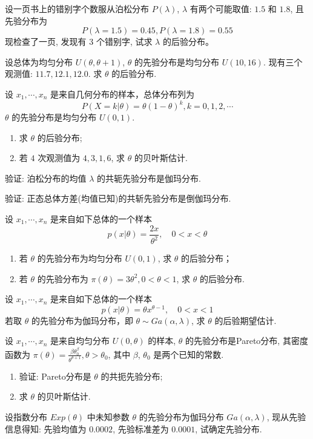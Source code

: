 \begin{xiti}
\item 设一页书上的错别字个数服从泊松分布 $P(\lambda)$, $\lambda$ 有两个可能取值: $1.5$ 和 $1.8$, 且先验分布为
\[P(\lambda=1.5)=0.45, P(\lambda=1.8)=0.55\]
现检查了一页, 发现有 $3$ 个错别字, 试求 $\lambda$ 的后验分布。
\item 设总体为均匀分布 $U(\theta,\theta+1)$, $\theta$ 的先验分布是均匀分布 $U(10,16)$. 现有三个观测值: $11.7,12.1,12.0$. 求 $\theta$ 的后验分布.
    
\item 设 $x_1,\cdots,x_n$ 是来自几何分布的样本，总体分布列为
\[P(X=k | \theta)=\theta(1-\theta)^{k}, k=0,1,2, \cdots\]
$\theta$ 的先验分布是均匀分布 $U(0,1)$.
\begin{enumerate}
  \item 求 $\theta$ 的后验分布;
  \item 若 $4$ 次观测值为 $4,3,1,6$, 求 $\theta$ 的贝叶斯估计.
\end{enumerate}

\item 验证: 泊松分布的均值 $\lambda$ 的共轭先验分布是伽玛分布.

\item 验证: 正态总体方差(均值已知)的共斩先验分布是倒伽玛分布.

\item 设 $x_1,\cdots,x_n$ 是来自如下总体的一个样本
\[p(x|\theta)=\frac{2 x}{\theta^{2}},\quad 0<x<\theta\]
\begin{enumerate}
  \item 若 $\theta$ 的先验分布为均匀分布 $U(0,1)$, 求 $\theta$ 的后验分布；
  \item 若 $\theta$ 的先验分布为 $\pi(\theta)=3 \theta^{2}, 0<\theta<1$, 求 $\theta$ 的后验分布.
\end{enumerate}

\item 设 $x_1,\cdots,x_n$ 是来自如下总体的一个样本
\[p(x | \theta)=\theta x^{\theta-1}, \quad 0<x<1\]
若取 $\theta$ 的先验分布为伽玛分布，即 $\theta \sim Ga (\alpha, \lambda)$, 求 $\theta$ 的后验期望估计.

\item 设 $x_1,\cdots,x_n$ 是来自均匀分布 $U(0,\theta)$ 的样本, $\theta$ 的先验分布是Pareto分布, 其密度函数为 $\pi(\theta)=\frac{\beta \theta_{0}^{\beta}}{\theta^{\theta+1}}, \theta>\theta_{0}$, 其中 $\beta$, $\theta_0$ 是两个已知的常数.
\begin{enumerate}
  \item 验证: Pareto分布是 $\theta$ 的共扼先验分布;
  \item 求 $\theta$ 的贝叶斯估计.
\end{enumerate}

\item 设指数分布 $Exp(\theta)$ 中未知参数 $\theta$ 的先验分布为伽玛分布 $Ga (\alpha, \lambda)$, 现从先验信息得知: 先验均值为 $0.0002$, 先验标准差为 $0.0001$, 试确定先验分布.
\end{xiti}

